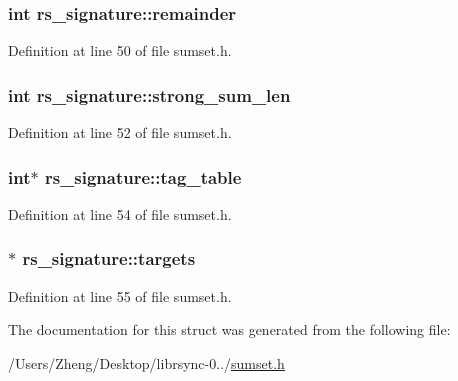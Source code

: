 \subsubsection[{remainder}]{\setlength{\rightskip}{0pt plus 5cm}int rs\+\_\+signature\+::remainder}\label{structrs__signature_a8bd8dfaab78ca01823b9fb0cdd8c8b6c}


Definition at line 50 of file sumset.\+h.

\hypertarget{structrs__signature_add195cbc6542234b4b59971b1ddf4e1b}{}
\subsubsection[{strong\+\_\+sum\+\_\+len}]{\setlength{\rightskip}{0pt plus 5cm}int rs\+\_\+signature\+::strong\+\_\+sum\+\_\+len}\label{structrs__signature_add195cbc6542234b4b59971b1ddf4e1b}


Definition at line 52 of file sumset.\+h.

\hypertarget{structrs__signature_a1e39937d73023e4c238f6c6e42acc9ac}{}
\subsubsection[{tag\+\_\+table}]{\setlength{\rightskip}{0pt plus 5cm}int$\ast$ rs\+\_\+signature\+::tag\+\_\+table}\label{structrs__signature_a1e39937d73023e4c238f6c6e42acc9ac}


Definition at line 54 of file sumset.\+h.

\hypertarget{structrs__signature_aee551f0003c68e2ad1dadb83e4874a15}{}
\subsubsection[{targets}]{$\ast$ rs\+\_\+signature\+::targets}\label{structrs__signature_aee551f0003c68e2ad1dadb83e4874a15}


Definition at line 55 of file sumset.\+h.



The documentation for this struct was generated from the following file\+:\begin{DoxyCompactItemize}
\item 
/\+Users/\+Zheng/\+Desktop/librsync-\/0../\hyperlink{sumset_8h}{sumset.\+h}\end{DoxyCompactItemize}

